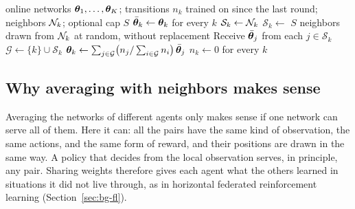 \begin{algorithm}[tbp]
  \caption{One round of gossip aggregation}
  \label{alg:pa-gossip}
  \begin{algorithmic}[1]
    \Require online networks $\bm{\theta}_1, \dots, \bm{\theta}_K$; transitions $n_k$ trained on since the last
      round; neighbors $\mathcal{N}_k$; optional cap $S$
    \State $\bar{\bm{\theta}}_k \gets \bm{\theta}_k$ for every $k$ 
      \State $\mathcal{S}_k \gets \mathcal{N}_k$
        \State $\mathcal{S}_k \gets$ $S$ neighbors drawn from $\mathcal{N}_k$ at random, without replacement
      \EndIf
        \State Receive $\bar{\bm{\theta}}_j$ from each $j \in \mathcal{S}_k$ 
        \State $\mathcal{G} \gets \{k\} \cup \mathcal{S}_k$
        \State $\textstyle\bm{\theta}_k \gets \sum_{j \in \mathcal{G}} \bigl(n_j / \textstyle\sum_{i \in \mathcal{G}}
          n_i\bigr)\, \bar{\bm{\theta}}_j$
      \EndIf
    \EndFor
    \State $n_k \gets 0$ for every $k$
  \end{algorithmic}
\end{algorithm}

\subsection{Why averaging with neighbors makes sense}
\label{sec:pa-gossip-why}

Averaging the networks of different agents only makes sense if one network can serve all of them. Here it
can: all the pairs have the same kind of observation, the same actions, and the same form of reward, and their
positions are drawn in the same way. A policy that decides from the local observation serves, in principle,
any pair. Sharing weights therefore gives each agent what the others learned in situations it did not live
through, as in horizontal federated reinforcement learning (Section~\ref{sec:bg-fl}).

